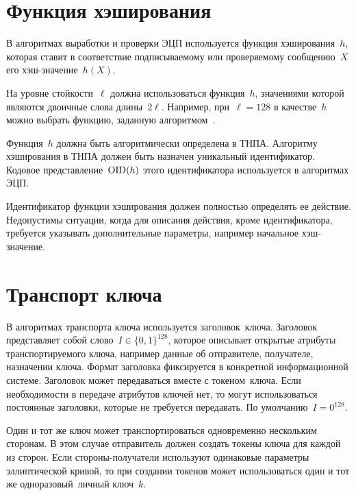 \section{Функция хэширования}\label{COMMON.Hash}

В алгоритмах выработки и проверки ЭЦП используется функция 
хэширования~$h$, которая ставит в соответствие подписываемому или 
проверяемому сообщению~$X$ его хэш-значение~$h(X)$.
%

На уровне стойкости~$\ell$ должна использоваться функция~$h$,
значениями которой являются двоичные слова длины~$2\ell$.
Например, при~$\ell=128$ в качестве~$h$ можно 
выбрать функцию, заданную алгоритмом~.

Функция~$h$ должна быть алгоритмически определена в ТНПА.
Алгоритму хэширования в ТНПА должен быть назначен уникальный идентификатор. 
Кодовое представление~$\text{\normalfont OID}(h)$ этого идентификатора 
используется в алгоритмах ЭЦП. 

Идентификатор функции хэширования должен полностью определять ее действие.
Недопустимы ситуации, когда для описания действия, кроме идентификатора,
требуется указывать дополнительные параметры, например
начальное хэш-значение.


\section{Транспорт ключа}\label{COMMON.Transport}

В алгоритмах транспорта ключа используется заголовок~ключа.
Заголовок представляет собой слово~$I\in\{0,1\}^{128}$,
которое описывает открытые атрибуты транспортируемого ключа,
например данные об отправителе, получателе, назначении ключа.
%
Формат заголовка фиксируется в конкретной информационной системе.
%
Заголовок может передаваться вместе с токеном~ключа.
%
%
Если необходимости в передаче атрибутов ключей нет,
то могут использоваться постоянные заголовки, 
которые не требуется передавать.
По умолчанию~$I=0^{128}$.

Один и тот же ключ может транспортироваться одновременно 
нескольким сторонам. В этом случае отправитель должен
создать токены ключа для каждой из сторон.
%
Если стороны-получатели используют одинаковые 
параметры эллиптической кривой, 
то при создании токенов может использоваться
один и тот же одноразовый~личный ключ~$k$.

